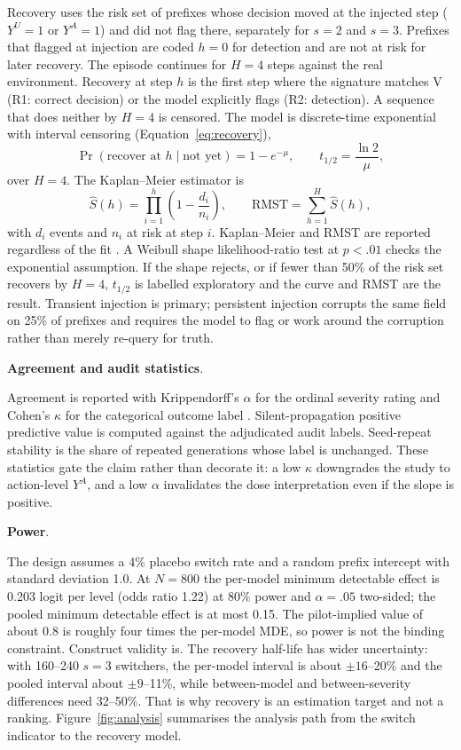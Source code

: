 \documentclass[a4paper,fleqn]{cas-sc}
\begin{document}
Recovery uses the risk set of prefixes whose decision moved at the injected step ($Y^{U}=1$ or
$Y^{A}=1$) and did not flag there, separately for $s=2$ and $s=3$. Prefixes that flagged at
injection are coded $h=0$ for detection and are not at risk for later recovery. The episode
continues for $H=4$ steps against the real environment. Recovery at step $h$ is the first step
where the signature matches V (R1: correct decision) or the model explicitly flags (R2:
detection). A sequence that does neither by $H=4$ is censored. The model is discrete-time
exponential with interval censoring (Equation~\ref{eq:recovery}),
\begin{equation}
  \Pr(\text{recover at } h \mid \text{not yet}) = 1-e^{-\mu},
  \qquad
  t_{1/2} = \frac{\ln 2}{\mu},
  \label{eq:recovery}
\end{equation}
over $H=4$. The Kaplan--Meier estimator is
\begin{equation}
  \hat S(h) = \prod_{i=1}^{h}\left(1-\frac{d_i}{n_i}\right),\qquad
  \mathrm{RMST} = \sum_{h=1}^{H} \hat S(h),
  \label{eq:km}
\end{equation}
with $d_i$ events and $n_i$ at risk at step $i$. Kaplan--Meier and RMST are reported regardless
of the fit \cite{kaplan1958}. A Weibull shape likelihood-ratio test at $p<.01$ checks the
exponential assumption. If the shape rejects, or if fewer than 50\% of the risk set recovers by $H=4$,
$t_{1/2}$ is labelled exploratory and the curve and RMST are the result. Transient injection is
primary; persistent injection corrupts the same field on 25\% of prefixes and requires the model
to flag or work around the corruption rather than merely re-query for truth.

\noindent\textbf{Agreement and audit statistics}.\

Agreement is reported with Krippendorff's $\alpha$ for the ordinal severity rating
\cite{krippendorff} and Cohen's $\kappa$ for the categorical outcome label \cite{cohen1960}.
Silent-propagation positive predictive value is computed against the adjudicated audit labels.
Seed-repeat stability is the share of repeated generations whose label is unchanged. These
statistics gate the claim rather than decorate it: a low $\kappa$ downgrades the study to
action-level $Y^{A}$, and a low $\alpha$ invalidates the dose interpretation even if the slope is
positive.

\noindent\textbf{Power}.\

The design assumes a 4\% placebo switch rate and a random prefix intercept with standard
deviation 1.0. At $N=800$ the per-model minimum detectable effect is 0.203 logit per level (odds
ratio 1.22) at 80\% power and $\alpha=.05$ two-sided; the pooled minimum detectable effect is at
most 0.15. The pilot-implied value of about 0.8 is roughly four times the per-model MDE, so power
is not the binding constraint. Construct validity is. The recovery half-life has wider
uncertainty: with 160--240 $s=3$ switchers, the per-model interval is about $\pm16$--20\% and the
pooled interval about $\pm9$--11\%, while between-model and between-severity differences need
32--50\%. That is why recovery is an estimation target and not a ranking.
Figure~\ref{fig:analysis} summarises the analysis path from the switch indicator to the recovery
model.
\end{document}

